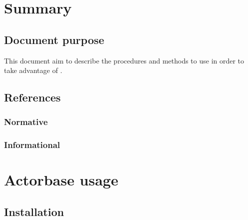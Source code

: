 \documentclass{scalatekids-article}
\begin{document}
\section{Summary}
\subsection{Document purpose}
This document aim to describe the procedures and methods to use in order to take advantage of .

\subsection{References}

\subsubsection{Normative} %

\subsubsection{Informational} %








\section{Actorbase usage}

\subsection{Installation}
\end{document}
